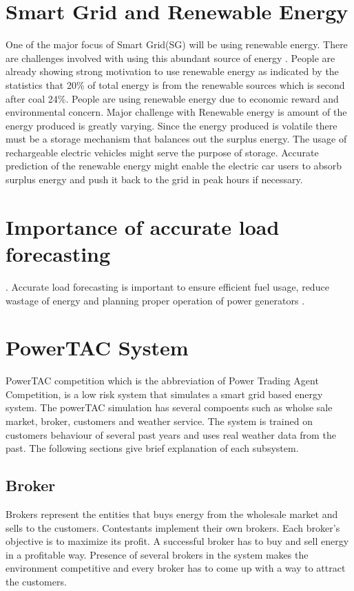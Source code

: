 \section{Smart Grid and Renewable Energy}
One of the major focus of Smart Grid(SG) will be using renewable energy. There are challenges involved with using this abundant source of energy \cite{richter2012transitioning}. People are already showing strong motivation to use renewable energy as indicated by the statistics that 20\% of total energy is from the renewable sources which is second after coal 24\%. People are using renewable energy due to economic reward and environmental concern. Major challenge with Renewable energy is amount of the energy produced is greatly varying. Since the energy produced is volatile there must be a storage mechanism that balances out the surplus energy. The usage of rechargeable electric vehicles might serve the purpose of storage. Accurate prediction of the renewable energy might enable the electric car users to absorb surplus energy and push it back to the grid in peak hours if necessary. 




\section{Importance of accurate load forecasting}.
Accurate load forecasting is important to ensure efficient fuel usage, reduce wastage of energy and planning proper operation of power generators \cite{liu2006accurate}.


\section{PowerTAC System}
PowerTAC competition which is the abbreviation of Power Trading Agent Competition, is a low risk system that simulates a smart grid based energy system. The powerTAC simulation has several compoents such as wholse sale market, broker, customers and weather service. The system is trained on customers behaviour of several past years and uses real weather data from the past. The following sections give brief explanation of each subsystem.

\subsection{Broker}
Brokers represent the entities that buys energy from the wholesale market and sells to the customers. Contestants implement their own brokers. Each broker's objective is to maximize its profit. A successful broker has to buy and sell energy in a profitable way. Presence of several brokers in the system makes the environment competitive and every broker has to come up with a way to attract the customers. 

